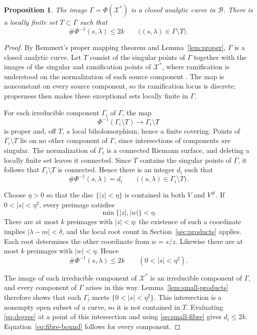 \documentclass[11pt]{article}
\newtheorem{proposition}[theorem]{Proposition}
\theoremstyle{remark}
\numberwithin{equation}{section}
\newcommand{\X}{\mathcal X}
\newcommand{\B}{\mathcal B}
\begin{document}
\begin{proposition}\label{prop:degree}
The image \(\Gamma=\Phi(\X^*)\) is a closed analytic curve in \(\B\).
There is a locally finite set \(T\subset\Gamma\) such that
\begin{equation}\label{eq:fibre-bound}
 \#\Phi^{-1}(s,\lambda)\le2k
 \qquad\bigl((s,\lambda)\in\Gamma\setminus T\bigr).
\end{equation}
\end{proposition}

\begin{proof}
By Remmert's proper mapping theorem
\cite[Chapter II, Theorem 8.8, p.~118]{Demailly} and Lemma~\ref{lem:proper},
\(\Gamma\) is a closed analytic curve.
Let \(T\) consist of the singular points of \(\Gamma\) together with
the images of the singular and ramification points of \(\X^*\), where
ramification is understood on the normalization of each source
component \cite[Chapter II, Theorem~7.12, pp.~114--115]{Demailly}.
The map is nonconstant on every source component, so its
ramification locus is discrete; properness then makes these exceptional
sets locally finite in \(\Gamma\).

For each irreducible component \(\Gamma_i\) of \(\Gamma\), the map
\[
 \Phi^{-1}(\Gamma_i\setminus T)\longrightarrow\Gamma_i\setminus T
\]
is proper and, off \(T\), a local biholomorphism, hence a finite covering.
Points of \(\Gamma_i\setminus T\) lie on no other component of
\(\Gamma\), since intersections of components are singular.
The normalization of \(\Gamma_i\) is a connected Riemann surface,
and deleting a locally finite set leaves it connected.
Since \(T\) contains the singular points of \(\Gamma\), it follows that
\(\Gamma_i\setminus T\) is connected. Hence there is an integer
\(d_i\) such that
\begin{equation}\label{eq:degree}
 \#\Phi^{-1}(s,\lambda)=d_i
 \qquad\bigl((s,\lambda)\in\Gamma_i\setminus T\bigr).
\end{equation}

Choose \(\eta>0\) so that the disc \(\{|z|<\eta\}\) is contained
in both \(V\) and \(V^\#\).
If \(0<|s|<\eta^2\), every preimage satisfies
\[
 \min\{|z|,|w|\}<\eta.
\]
There are at most \(k\) preimages with \(|z|<\eta\): the existence
of such a coordinate implies \(|\lambda-m|<\delta\), and the local
root count in Section~\ref{sec:products} applies. Each root determines
the other coordinate from \(w=s/z\).
Likewise there are at most \(k\) preimages with \(|w|<\eta\).
Hence
\begin{equation}\label{eq:small-fibre}
 \#\Phi^{-1}(s,\lambda)\le2k
 \qquad(0<|s|<\eta^2).
\end{equation}

The image of each irreducible component of \(\X^*\) is an
irreducible component of \(\Gamma\), and every component of
\(\Gamma\) arises in this way.
Lemma~\ref{lem:small-products} therefore shows that each \(\Gamma_i\)
meets \(\{0<|s|<\eta^2\}\).
This intersection is a nonempty open subset of a curve, so it is
not contained in \(T\).
Evaluating \eqref{eq:degree} at a point of this intersection and
using \eqref{eq:small-fibre} gives \(d_i\le2k\).
Equation~\eqref{eq:fibre-bound} follows for every component.
\end{proof}
\end{document}
